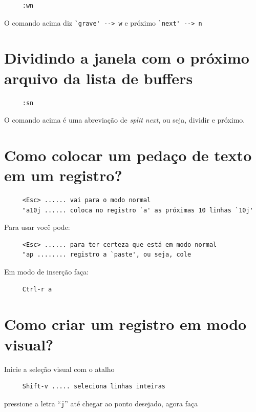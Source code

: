 \documentclass[10pt,a4paper,openany]{book}
\begin{document}
\begin{verbatim}
     :wn
\end{verbatim}

O comando acima diz \verb|`grave' --> w|  e próximo \verb|`next' --> n|

\section{Dividindo a janela com o próximo arquivo da lista de buffers}
\label{Dividindo a janela com o próximo arquivo da lista de buffers}

\begin{verbatim}
     :sn
\end{verbatim}

O comando acima é uma abreviação de {\em split next}, ou seja, dividir e próximo.

\section{Como colocar um pedaço de texto em um registro?}
\label{Como colocar um pedaço de texto em um registro?}

\begin{verbatim}
     <Esc> ...... vai para o modo normal
     "a10j ...... coloca no registro `a' as próximas 10 linhas `10j'
\end{verbatim}

Para usar você pode:

\begin{verbatim}
     <Esc> ...... para ter certeza que está em modo normal
     "ap ........ registro a `paste', ou seja, cole
\end{verbatim}

Em modo de inserção faça:

\begin{verbatim}
     Ctrl-r a
\end{verbatim}

\section{Como criar um registro em modo visual?}
\label{Como criar um registro em modo visual?}
Inicie a seleção visual com o atalho

\begin{verbatim}
     Shift-v ..... seleciona linhas inteiras
\end{verbatim}

pressione a letra ``\verb|j|'' até chegar ao ponto desejado, agora faça
\end{document}
